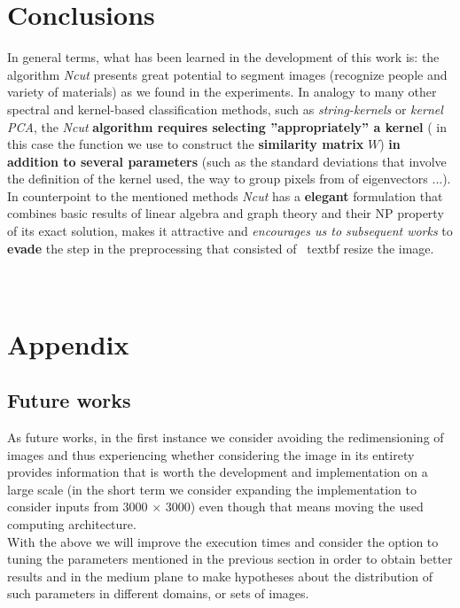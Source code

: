 \documentclass[conference]{IEEEtran}
\theoremstyle{definition}
\begin{document}
\section{Conclusions}
In general terms, what has been learned in the development of this work is: the algorithm \textit {Ncut} presents great potential to segment images (recognize people and variety of materials) as we found in the experiments. In analogy to many other spectral and kernel-based classification methods, such as \textit {string-kernels} or \textit {kernel PCA}, the \textit {Ncut} \textbf {algorithm requires selecting ''appropriately'' a kernel} ( in this case the function we use to construct the \textbf {similarity matrix} $ W $) \textbf {in addition to several parameters} (such as the standard deviations that involve the definition of the kernel used, the way to group pixels from of eigenvectors ...). In counterpoint to the mentioned methods \textit {Ncut} has a \textbf {elegant} formulation that combines basic results of linear algebra and graph theory and their NP property of its exact solution, makes it attractive and \textit {encourages us to subsequent works} to \textbf {evade} the step in the preprocessing that consisted of \ textbf {resize the image}.\\\\\\


\section*{Appendix}

\subsection*{Future works}
As future works, in the first instance we consider avoiding the redimensioning of images and thus experiencing whether considering the image in its entirety provides information that is worth the development and implementation on a large scale (in the short term we consider expanding the implementation to consider inputs from 3000 $ \times $ 3000) even though that means moving the used computing architecture. \\
With the above we will improve the execution times and consider the option to tuning the parameters mentioned in the previous section in order to obtain better results and in the medium plane to make hypotheses about the distribution of such parameters in different domains, or sets of images.
\end{document}
